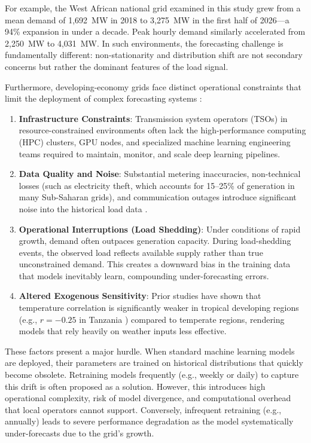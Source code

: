 \documentclass[journal]{IEEEtran}
\begin{document}
For example, the West African national grid examined in this study grew from a mean demand of 1,692~MW in 2018 to 3,275~MW in the first half of 2026---a 94\% expansion in under a decade. Peak hourly demand similarly accelerated from 2,250~MW to 4,031~MW. In such environments, the forecasting challenge is fundamentally different: non-stationarity and distribution shift are not secondary concerns but rather the dominant features of the load signal.

Furthermore, developing-economy grids face distinct operational constraints that limit the deployment of complex forecasting systems \cite{mvungi2021}:
\begin{enumerate}
    \item \textbf{Infrastructure Constraints}: Transmission system operators (TSOs) in resource-constrained environments often lack the high-performance computing (HPC) clusters, GPU nodes, and specialized machine learning engineering teams required to maintain, monitor, and scale deep learning pipelines.
    \item \textbf{Data Quality and Noise}: Substantial metering inaccuracies, non-technical losses (such as electricity theft, which accounts for 15--25\% of generation in many Sub-Saharan grids), and communication outages introduce significant noise into the historical load data \cite{mvungi2021, daut2017}.
    \item \textbf{Operational Interruptions (Load Shedding)}: Under conditions of rapid growth, demand often outpaces generation capacity. During load-shedding events, the observed load reflects available supply rather than true unconstrained demand. This creates a downward bias in the training data that models inevitably learn, compounding under-forecasting errors.
    \item \textbf{Altered Exogenous Sensitivity}: Prior studies have shown that temperature correlation is significantly weaker in tropical developing regions (e.g., $r = -0.25$ in Tanzania \cite{mvungi2021}) compared to temperate regions, rendering models that rely heavily on weather inputs less effective.
\end{enumerate}

These factors present a major hurdle. When standard machine learning models are deployed, their parameters are trained on historical distributions that quickly become obsolete. Retraining models frequently (e.g., weekly or daily) to capture this drift is often proposed as a solution. However, this introduces high operational complexity, risk of model divergence, and computational overhead that local operators cannot support. Conversely, infrequent retraining (e.g., annually) leads to severe performance degradation as the model systematically under-forecasts due to the grid's growth.
\end{document}
